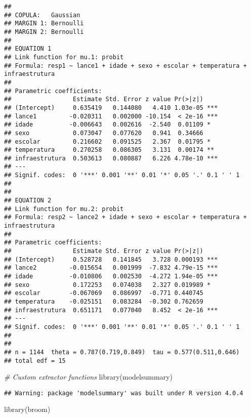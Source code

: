 \documentclass[
]{article}
\newenvironment{Shaded}{\begin{snugshade}}{\end{snugshade}}
\newcommand{\CommentTok}[1]{\textcolor[rgb]{0.56,0.35,0.01}{\textit{#1}}}
\newcommand{\FunctionTok}[1]{\textcolor[rgb]{0.00,0.00,0.00}{#1}}
\newcommand{\NormalTok}[1]{#1}
\begin{document}
\begin{verbatim}
## 
## COPULA:   Gaussian
## MARGIN 1: Bernoulli
## MARGIN 2: Bernoulli
## 
## EQUATION 1
## Link function for mu.1: probit 
## Formula: resp1 ~ lance1 + idade + sexo + escolar + temperatura + infraestrutura
## 
## Parametric coefficients:
##                 Estimate Std. Error z value Pr(>|z|)    
## (Intercept)     0.635419   0.144080   4.410 1.03e-05 ***
## lance1         -0.020311   0.002000 -10.154  < 2e-16 ***
## idade          -0.006643   0.002616  -2.540  0.01109 *  
## sexo            0.073047   0.077620   0.941  0.34666    
## escolar         0.216602   0.091525   2.367  0.01795 *  
## temperatura     0.270258   0.086305   3.131  0.00174 ** 
## infraestrutura  0.503613   0.080887   6.226 4.78e-10 ***
## ---
## Signif. codes:  0 '***' 0.001 '**' 0.01 '*' 0.05 '.' 0.1 ' ' 1
## 
## 
## EQUATION 2
## Link function for mu.2: probit 
## Formula: resp2 ~ lance2 + idade + sexo + escolar + temperatura + infraestrutura
## 
## Parametric coefficients:
##                 Estimate Std. Error z value Pr(>|z|)    
## (Intercept)     0.528728   0.141845   3.728 0.000193 ***
## lance2         -0.015654   0.001999  -7.832 4.79e-15 ***
## idade          -0.010806   0.002530  -4.272 1.94e-05 ***
## sexo            0.172253   0.074038   2.327 0.019989 *  
## escolar        -0.067069   0.086997  -0.771 0.440745    
## temperatura    -0.025151   0.083284  -0.302 0.762659    
## infraestrutura  0.651171   0.077040   8.452  < 2e-16 ***
## ---
## Signif. codes:  0 '***' 0.001 '**' 0.01 '*' 0.05 '.' 0.1 ' ' 1
## 
## 
## n = 1144  theta = 0.787(0.719,0.849)  tau = 0.577(0.511,0.646)
## total edf = 15
\end{verbatim}

\begin{Shaded}
\begin{Highlighting}[]
\CommentTok{\# Custom extractor functions}
\FunctionTok{library}\NormalTok{(modelsummary)}
\end{Highlighting}
\end{Shaded}

\begin{verbatim}
## Warning: package 'modelsummary' was built under R version 4.0.4
\end{verbatim}

\begin{Shaded}
\begin{Highlighting}[]
\FunctionTok{library}\NormalTok{(broom)}
\end{Highlighting}
\end{Shaded}
\end{document}
